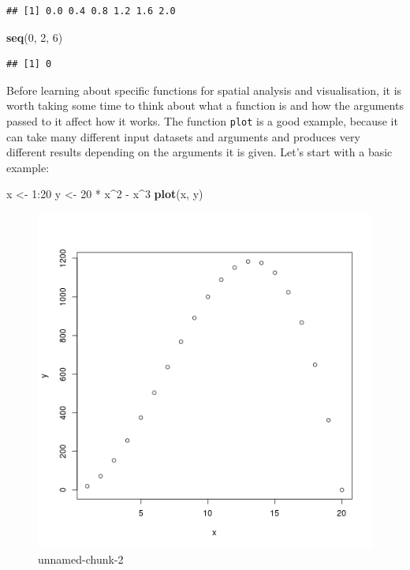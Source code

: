 \documentclass[]{article}
\makeatletter
\newenvironment{Shaded}{}{}
\newcommand{\KeywordTok}[1]{\textcolor[rgb]{0.00,0.44,0.13}{\textbf{{#1}}}}
\newcommand{\DecValTok}[1]{\textcolor[rgb]{0.25,0.63,0.44}{{#1}}}
\newcommand{\StringTok}[1]{\textcolor[rgb]{0.25,0.44,0.63}{{#1}}}
\newcommand{\NormalTok}[1]{{#1}}
\def\maxwidth{\ifdim\Gin@nat@width>\linewidth\linewidth
\else\Gin@nat@width\fi}
\let\Oldincludegraphics\includegraphics
\renewcommand{\includegraphics}[1]{\Oldincludegraphics[width=\maxwidth]{#1}}
\makeatother
\begin{document}
\begin{verbatim}
## [1] 0.0 0.4 0.8 1.2 1.6 2.0
\end{verbatim}

\begin{Shaded}
\begin{Highlighting}[]
\KeywordTok{seq}\NormalTok{(}\DecValTok{0}\NormalTok{, }\DecValTok{2}\NormalTok{, }\DecValTok{6}\NormalTok{)}
\end{Highlighting}
\end{Shaded}

\begin{verbatim}
## [1] 0
\end{verbatim}

Before learning about specific functions for spatial analysis and
visualisation, it is worth taking some time to think about what a
function is and how the arguments passed to it affect how it works. The
function \texttt{plot} is a good example, because it can take many
different input datasets and arguments and produces very different
results depending on the arguments it is given. Let's start with a basic
example:

\begin{Shaded}
\begin{Highlighting}[]
\NormalTok{x <-}\StringTok{ }\DecValTok{1}\NormalTok{:}\DecValTok{20}
\NormalTok{y <-}\StringTok{ }\DecValTok{20} \NormalTok{*}\StringTok{ }\NormalTok{x^}\DecValTok{2} \NormalTok{-}\StringTok{ }\NormalTok{x^}\DecValTok{3}
\KeywordTok{plot}\NormalTok{(x, y)}
\end{Highlighting}
\end{Shaded}

\begin{figure}[htbp]
\centering
\includegraphics{figure/unnamed-chunk-2.png}
\caption{unnamed-chunk-2}
\end{figure}
\end{document}
